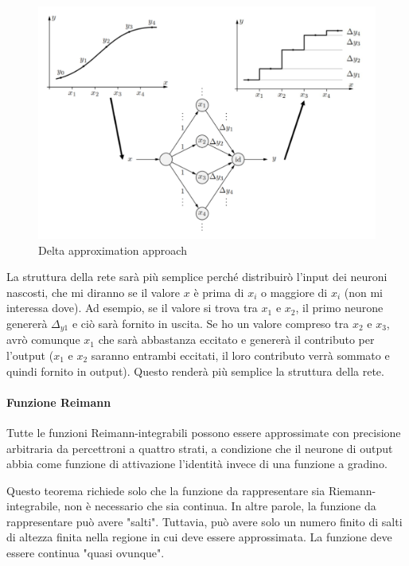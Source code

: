 \begin{figure}[h]
    \centering
    \includegraphics[scale=0.45]{images/delta_approximation_approach.png}
    \caption{Delta approximation approach}
\end{figure}

La struttura della rete sarà più semplice perché distribuirò l'input dei neuroni nascosti, che mi diranno se il valore $x$ è prima di $x_i$ o maggiore di $x_i$ (non mi interessa dove). Ad esempio, se il valore si trova tra $x_1$ e $x_2$, il primo neurone genererà $\Delta_{y1}$ e ciò sarà fornito in uscita. Se ho un valore compreso tra $x_2$ e $x_3$, avrò comunque $x_1$ che sarà abbastanza eccitato e genererà il contributo per l'output ($x_1$ e $x_2$ saranno entrambi eccitati, il loro contributo verrà sommato e quindi fornito in output). Questo renderà più semplice la struttura della rete.

\paragraph{Funzione Reimann}
Tutte le funzioni Reimann-integrabili possono essere approssimate con precisione arbitraria da percettroni a quattro strati, a condizione che il neurone di output abbia come funzione di attivazione l'identità invece di una funzione a gradino.

Questo teorema richiede solo che la funzione da rappresentare sia Riemann-integrabile, non è necessario che sia continua. In altre parole, la funzione da rappresentare può avere "salti". Tuttavia, può avere solo un numero finito di salti di altezza finita nella regione in cui deve essere approssimata. La funzione deve essere continua "quasi ovunque".


